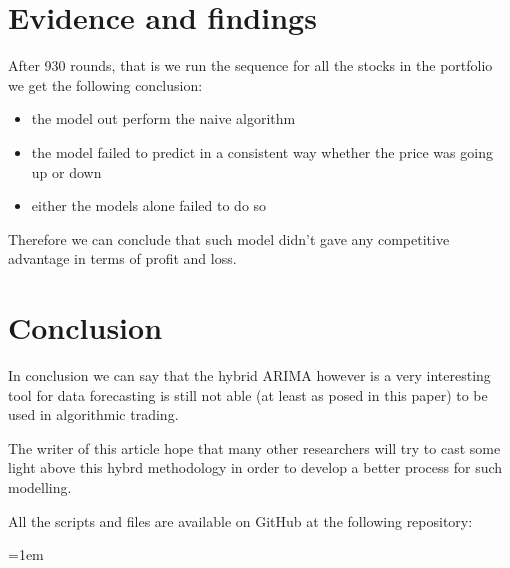 \documentclass[twocolumn]{article}
\begin{document}
\section{Evidence and findings}
After 930 rounds, that is we run the sequence for all the stocks in the portfolio we get the following conclusion:
\begin{itemize}
    \item the model out perform the naive algorithm
    \item the model failed to predict in a consistent way whether the price was going up or down
    \item either the models alone failed to do so 
\end{itemize}
Therefore we can conclude that such model didn't gave any competitive advantage in terms of profit and loss.


\section{Conclusion}
In conclusion we can say that the hybrid ARIMA however is a very interesting tool for data forecasting is still not able (at least as posed in this paper) to be used in algorithmic trading. 

The writer of this article hope that many other researchers will try to cast some light above this hybrd methodology in order to develop a better process for such modelling.

All the scripts and files are available on GitHub at the following repository: 

\newpage
\emergencystretch=1em
\sloppy
\printbibliography
\end{document}
